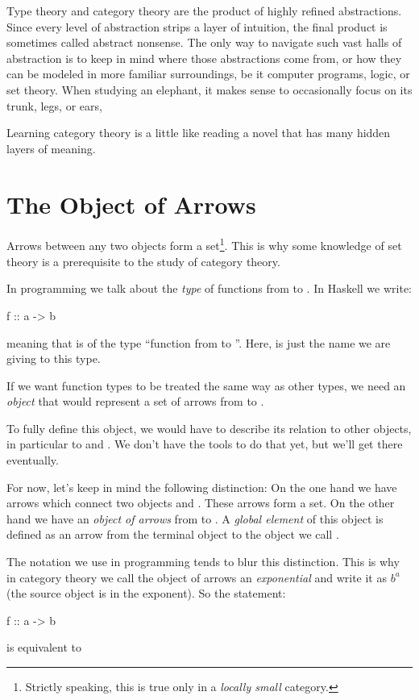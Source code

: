 \documentclass[DaoFP]{subfiles}
\begin{document}
Type theory and category theory are the product of highly refined abstractions. Since every level of abstraction strips a layer of intuition, the final product is sometimes called abstract nonsense. The only way to navigate such vast halls of abstraction is to keep in mind where those abstractions come from, or how they can be modeled in more familiar surroundings, be it computer programs, logic, or set theory. When studying an elephant, it makes sense to occasionally focus on its trunk, legs, or ears, 

Learning category theory is a little like reading a novel that has many hidden layers of meaning.

\section{The Object of Arrows}

Arrows between any two objects form a set\footnote{Strictly speaking, this is true only in a \emph{locally small} category.}. This is why some knowledge of set theory is a prerequisite to the study of category theory. 

In programming we talk about the \emph{type} of functions from  to . In Haskell we write:
\begin{haskell}
f :: a -> b
\end{haskell}
meaning that  is of the type ``function from  to ''. Here,  is just the name we are giving to this type. 

If we want function types to be treated the same way as other types, we need an \emph{object} that would represent a set of arrows from  to .

To fully define this object, we would have to describe its relation to other objects, in particular to  and . We don't have the tools to do that yet, but we'll get there eventually. 

For now, let's keep in mind the following distinction: On the one hand we have arrows which connect two objects  and . These arrows form a set. On the other hand we have an \emph{object of arrows} from   to . A \emph{global element} of this object is defined as an arrow from the terminal object \hask{()} to the object we call . 

The notation we use in programming tends to blur this distinction. This is why in category theory we call the object of arrows an \emph{exponential} and write it as $ b^a$ (the source object is in the exponent). So the statement:
\begin{haskell}
f :: a -> b
\end{haskell}
is equivalent to
\end{document}
